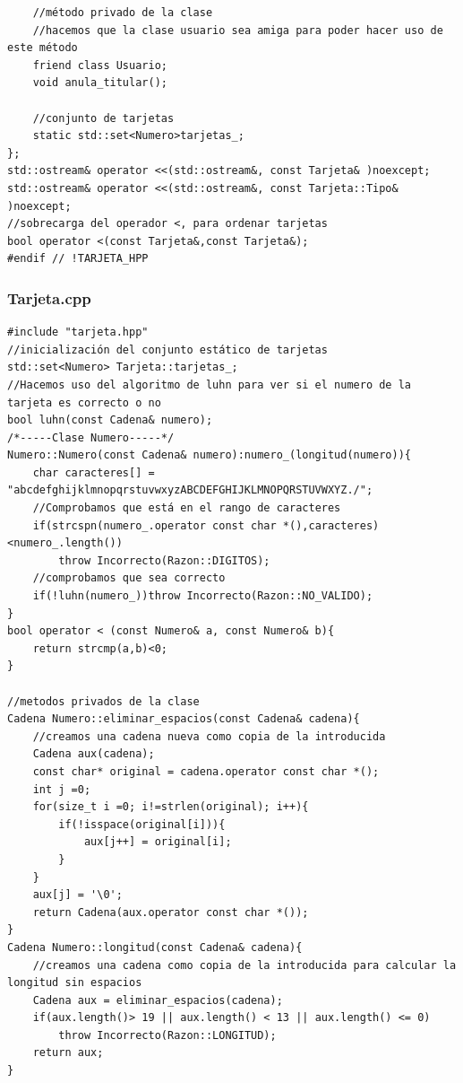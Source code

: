 \begin{verbatim}
    //método privado de la clase
    //hacemos que la clase usuario sea amiga para poder hacer uso de este método
    friend class Usuario;
    void anula_titular();

    //conjunto de tarjetas
    static std::set<Numero>tarjetas_;
};
std::ostream& operator <<(std::ostream&, const Tarjeta& )noexcept;
std::ostream& operator <<(std::ostream&, const Tarjeta::Tipo& )noexcept;
//sobrecarga del operador <, para ordenar tarjetas
bool operator <(const Tarjeta&,const Tarjeta&);
#endif // !TARJETA_HPP
\end{verbatim}

\subsubsection{Tarjeta.cpp}
\begin{verbatim}
#include "tarjeta.hpp"
//inicialización del conjunto estático de tarjetas
std::set<Numero> Tarjeta::tarjetas_;
//Hacemos uso del algoritmo de luhn para ver si el numero de la tarjeta es correcto o no
bool luhn(const Cadena& numero);
/*-----Clase Numero-----*/
Numero::Numero(const Cadena& numero):numero_(longitud(numero)){
    char caracteres[] = "abcdefghijklmnopqrstuvwxyzABCDEFGHIJKLMNOPQRSTUVWXYZ./";
    //Comprobamos que está en el rango de caracteres
    if(strcspn(numero_.operator const char *(),caracteres)<numero_.length())
        throw Incorrecto(Razon::DIGITOS);
    //comprobamos que sea correcto
    if(!luhn(numero_))throw Incorrecto(Razon::NO_VALIDO);
}
bool operator < (const Numero& a, const Numero& b){
    return strcmp(a,b)<0;
}

//metodos privados de la clase
Cadena Numero::eliminar_espacios(const Cadena& cadena){
    //creamos una cadena nueva como copia de la introducida
    Cadena aux(cadena);
    const char* original = cadena.operator const char *();
    int j =0;
    for(size_t i =0; i!=strlen(original); i++){
        if(!isspace(original[i])){
            aux[j++] = original[i];
        }
    }
    aux[j] = '\0';
    return Cadena(aux.operator const char *());
}
Cadena Numero::longitud(const Cadena& cadena){
    //creamos una cadena como copia de la introducida para calcular la longitud sin espacios
    Cadena aux = eliminar_espacios(cadena);
    if(aux.length()> 19 || aux.length() < 13 || aux.length() <= 0)
        throw Incorrecto(Razon::LONGITUD);
    return aux;
}


\end{verbatim}
